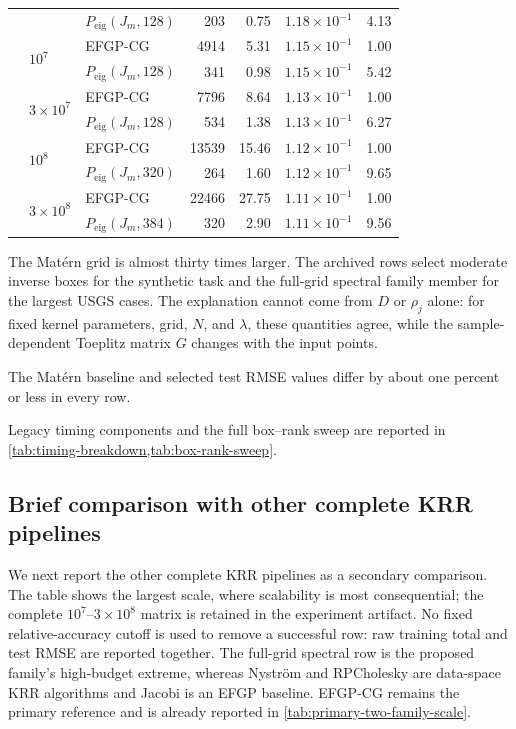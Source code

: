 \begin{table}[H]
\begin{tabular}{lllrrrr}
& & \(P_{\mathrm{eig}}(J_m,128)\) & 203 & 0.75 & \(1.18{\times}10^{-1}\) & 4.13 \\
& \multirow{2}{*}{\(10^7\)} & EFGP-CG & 4914 & 5.31 & \(1.15{\times}10^{-1}\) & 1.00 \\
& & \(P_{\mathrm{eig}}(J_m,128)\) & 341 & 0.98 & \(1.15{\times}10^{-1}\) & 5.42 \\
& \multirow{2}{*}{\(3{\times}10^7\)} & EFGP-CG & 7796 & 8.64 & \(1.13{\times}10^{-1}\) & 1.00 \\
& & \(P_{\mathrm{eig}}(J_m,128)\) & 534 & 1.38 & \(1.13{\times}10^{-1}\) & 6.27 \\
& \multirow{2}{*}{\(10^8\)} & EFGP-CG & 13539 & 15.46 & \(1.12{\times}10^{-1}\) & 1.00 \\
& & \(P_{\mathrm{eig}}(J_m,320)\) & 264 & 1.60 & \(1.12{\times}10^{-1}\) & 9.65 \\
& \multirow{2}{*}{\(3{\times}10^8\)} & EFGP-CG & 22466 & 27.75 & \(1.11{\times}10^{-1}\) & 1.00 \\
& & \(P_{\mathrm{eig}}(J_m,384)\) & 320 & 2.90 & \(1.11{\times}10^{-1}\) & 9.56 \\
\bottomrule
\end{tabular}
\end{table}

The Mat\'ern grid is almost thirty times larger. The archived rows select
moderate inverse boxes for the synthetic task and the full-grid spectral
family member for the largest USGS cases. The explanation cannot come from
\(D\) or \(\rho_j\) alone: for fixed
kernel parameters, grid, \(N\), and \(\lambda\), these quantities agree, while
the sample-dependent Toeplitz matrix \(G\) changes with the input points.

The Mat\'ern baseline and selected test RMSE values differ by about one percent
or less in every row.

Legacy timing components and the full box--rank sweep are reported in
\cref{tab:timing-breakdown,tab:box-rank-sweep}.

\fi

\subsection{Brief comparison with other complete KRR pipelines}
\label{subsec:other-krr}

We next report the other complete KRR pipelines as a secondary comparison.
The table shows the largest scale, where scalability is most consequential;
the complete \(10^7\)--\(3\times10^8\) matrix is retained in the experiment
artifact.  No fixed relative-accuracy cutoff is used to remove a successful
row: raw training total and test RMSE are reported together.  The full-grid
spectral row is the proposed family's high-budget extreme, whereas Nystr\"om
and RPCholesky are data-space KRR algorithms and Jacobi is an EFGP baseline.
EFGP-CG remains the primary reference and is already reported in
\cref{tab:primary-two-family-scale}.

